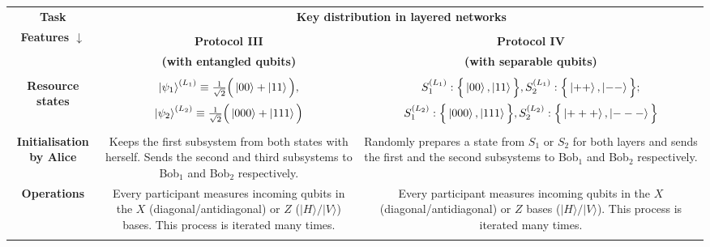 \documentclass[fleqn,10pt]{wlscirep}
\begin{document}
\begin{table}[hbt!]
\centering
\begin{tabular}{|c|c|c|}
\hline

\multirow{2}{*}{\textbf{Task}} &\multicolumn{2}{c|}{\multirow{2}{*}{\textbf{Key distribution in layered networks}}}\\
&\multicolumn{2}{c|}{}\\
\hline


\multirow{4}{*}{\textbf{Features $\downarrow$}} &&\\
&\textbf{Protocol III} & \textbf{Protocol IV}\\
& \multirow{1}{*}{\textbf{(with entangled qubits)}} & \multirow{1}{*}{\textbf{(with separable qubits)}}\\
&&\\
\hline



\multirow{4}{*}{\textbf{Resource states}} & \multirow{2}{*}{$\ket{\psi_1}^{(L_1)}\equiv\frac{1}{\sqrt{2}}\Big(\ket{00}+\ket{11}\Big), 
$} & \multirow{2}{*}{${S}_1^{(L_1)}:\Big\{\ket{00},\ket{11}\Big\}, { S}_2^{(L_1)}: \Big\{\ket{++},\ket{--}\Big\}; 
$}\\
&&\\
&\multirow{2}{*}{$\ket{\psi_2}^{(L_2)}\equiv\frac{1}{\sqrt{2}}\Big(\ket{000}+\ket{111}\Big)$}&${ S}_1^{(L_2)}:\Big\{\ket{000},\ket{111}\Big\}, { S}_2^{(L_2)}: \Big\{\ket{+++},\ket{---}\Big\}$\\
&&\\
\hline
\multirow{4}{3cm}{\textbf{Initialisation by Alice}} &\multirow{4}{6cm}{Keeps the first subsystem from both states with herself. Sends the second and third subsystems to Bob\(_1\) and Bob\(_2\) respectively.} & \multirow{4}{6cm}{ Randomly prepares a state from \(S_1\) or \(S_2\) for both layers and sends the first and the second subsystems to Bob\(_1\) and Bob\(_2\) respectively.}\\
&&\\
&&\\
&&\\
\hline

\multirow{5}{3cm}{\textbf{Operations}} &\multirow{3}{6cm}{Every participant measures incoming qubits in the $X$ (diagonal/antidiagonal) or $Z$ ($|H\rangle/|V\rangle$) bases. This process is iterated many times. } & \multirow{3}{6cm}{Every participant measures incoming qubits in the $X$ (diagonal/antidiagonal) or $Z$ bases ($|H\rangle/|V\rangle$). This process is iterated many times. }\\
&&\\
&&\\
&&\\
\hline


\end{tabular}
\end{table}
\end{document}
